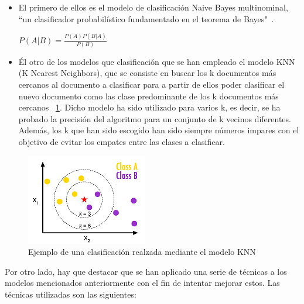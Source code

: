 \documentclass[conference,a4paper]{IEEEtran}
\begin{document}
\begin{itemize}
\item El primero de ellos es el modelo de clasificación Naive Bayes multinominal, ``un clasificador probabilístico fundamentado en el teorema de Bayes"~\cite{b3}.
\newline

\begin{center}
$ P(A|B) =  \frac{P(A)P(B|A)}{P(B)} $\\
\end{center}

\item Él otro de los modelos que clasificación que se han empleado el modelo KNN (K Nearest Neighbors), que se consiste en buscar los k documentos más cercanos al documento a clasificar para a partir de ellos poder clasificar el nuevo documento como las clase predominante de los k documentos más cercanos ~\ref{fig:knn}. Dicho modelo ha sido utilizado para varios k, es decir, se ha probado la precisión del algoritmo para un conjunto de k vecinos diferentes. Además, los k que han sido escogido han sido siempre números impares con el objetivo de evitar los empates entre las clases a clasificar.
\end{itemize}


\begin{figure}
  \centering
  \includegraphics{knn}
  \caption{Ejemplo de una clasificación realzada mediante el modelo KNN}
  \label{fig:knn}
\end{figure}

Por otro lado, hay que destacar que se han aplicado una serie de técnicas a los modelos mencionados anteriormente con el fin de intentar mejorar estos. Las técnicas utilizadas son las siguientes:
                          
\end{document}
